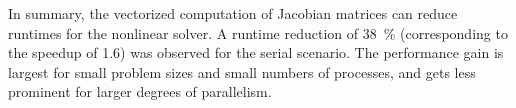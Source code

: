In summary, the vectorized computation of Jacobian matrices can reduce runtimes for the nonlinear solver. A runtime reduction of \SI{38}{\percent} (corresponding to the speedup of \num{1.6}) was observed for the serial scenario. The performance gain is largest for small problem sizes and small numbers of processes, and gets less prominent for larger degrees of parallelism.

